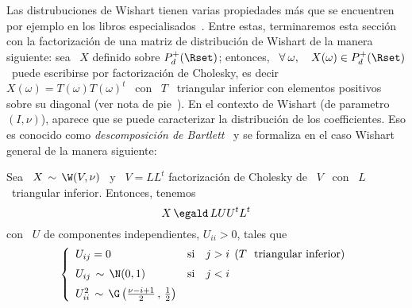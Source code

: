 Las distrubuciones de Wishart tienen  varias propiedades m\'as que se encuentren
por   ejemplo  en  los   libros  especialisados~\cite{Mui82,   GupNad99,  And03,
  Seb04}. Entre estas, terminaremos esta secci\'on con la factorizaci\'on de una
matriz de distribuci\'on  de Wishart de la manera siguiente:  sea \ $X$ definido
sobre  $P_d^+(\Rset)$;  entonces, \  $\forall  \:  \omega,  \quad X(\omega)  \in
P_d^+(\Rset)$ \  puede escribirse  por factorizaci\'on de  Cholesky, es  decir \
$X(\omega)  = T(\omega)  T(\omega)^t$  \ con  \  $T$ \  triangular inferior  con
elementos     positivos      sobre     su     diagonal      (ver     nota     de
pie~\footref{Foot:MP:WishartXtilde}).  En  el contexto de  Wishart (de parametro
$(I,\nu)$),  aparece  que  se   puede  caracterizar  la  distribuci\'on  de  los
coefficientes.     Eso    es   conocido    como    {\em   descomposici\'on    de
  Bartlett}~\cite{Bar34,  Mui82, GupNag99,  And03}  y se  formaliza  en el  caso
Wishart general de la manera siguiente:
%
\begin{teorema}\label{Teo:MP:Bartlett}
%
  Sea \ $X \, \sim \, \W(V,\nu)$ \  y \ $V = L L^t$ factorizaci\'on de Cholesky
  de \ $V$ \ con \ $L$ \ triangular inferior. Entonces, tenemos
  \[
  X \, \egald \, L U U^t L^t
  \]
  con \ $U$ de componentes independientes, $U_{ii} > 0$, tales que
  \[
  \left\{\begin{array}{lll}
  U_{ij} = 0 & \mbox{si} & j > i \:\: \mbox{($T$ \ triangular inferior)}\\[2mm]
  U_{ij} \, \sim \, \N(0,1) & \mbox{si} & j < i\\[2mm]
  U_{ii}^2 \, \sim \, \G\left( \frac{\nu-i+1}{2} \, , \, \frac12 \right) & &
  \end{array}\right.
  \]
\end{teorema}
%
